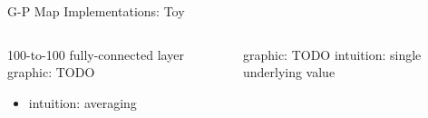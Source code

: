 \begin{frame}{G-P Map Implementations: Toy}

\begin{columns}
\begin{column}{0.5\textwidth}
100-to-100 fully-connected layer
graphic: TODO
\begin{itemize}
\item intuition: averaging
\end{itemize}
\end{column}
\begin{column}{0.5\textwidth}
graphic: TODO
intuition: single underlying value
\end{column}
\end{columns}

\end{frame}

